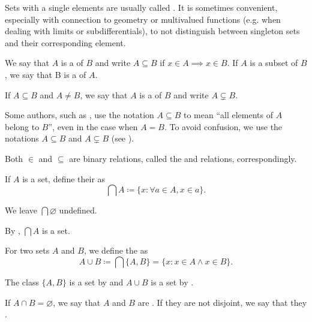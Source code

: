 \begin{remark}\label{remark:singleton_sets}
  Sets with a single elements are usually called . It is sometimes convenient, especially with connection to geometry or multivalued functions (e.g. when dealing with limits or subdifferentials), to not distinguish between singleton sets and their corresponding element.
\end{remark}

\begin{definition}\label{def:subset}
  We say that \( A \) is a  of \( B \) and write \( A \subseteq B \) if \( x \in A \implies x \in B \). If \( A \) is a subset of \( B \), we say that B is a  of \( A \).

  If \( A \subseteq B \) and \( A \neq B \), we say that \( A \) is a  of \( B \) and write \( A \subsetneq B \).
\end{definition}

\begin{remark}\label{remark:subset_notation}
  Some authors, such as \cite{Kelley1955}, use the notation \( A \subseteq B \) to mean \enquote{all elements of \( A \) belong to \( B \)}, even in the case when \( A = B \). To avoid confusion, we use the notations \( A \subseteq B \) and \( A \subsetneq B \) (see ).
\end{remark}

\begin{remark}\label{remark:subset_and_membership_relations}
  Both \( \in \) and \( \subseteq \) are binary relations, called the  and  relations, correspondingly.
\end{remark}

\begin{definition}\label{def:set_intersection}\cite[24]{Enderton1977}
  If \( A \) is a set, define their  as
  \begin{equation*}
    \bigcap A \coloneqq \{ x \colon \forall a \in A, x \in a \}.
  \end{equation*}

  We leave \( \bigcap \varnothing \) undefined.

  By , \( \bigcap A \) is a set.

  For two sets \( A \) and \( B \), we define the  as
  \begin{equation*}
    A \cup B \coloneqq \bigcap \{ A, B \} = \{ x \colon x \in A \land x \in B \}.
  \end{equation*}

  The class \( \{ A, B \} \) is a set by  and \( A \cup B \) is a set by .

  If \( A \cap B = \varnothing \), we say that \( A \) and \( B \) are . If they are not disjoint, we say that they .
\end{definition}

